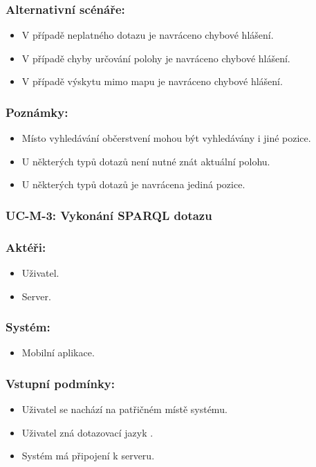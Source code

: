 \subsubsection*{Alternativní scénáře:}
\begin{itemize}
 \item V případě neplatného dotazu je navráceno chybové hlášení.
 \item V případě chyby určování polohy je navráceno chybové hlášení.
 \item V případě výskytu mimo mapu je navráceno chybové hlášení.
\end{itemize}
\subsubsection*{Poznámky:}
\begin{itemize}
 \item Místo vyhledávání občerstvení mohou být vyhledávány i jiné pozice.
 \item U některých typů dotazů není nutné znát aktuální polohu.
 \item U některých typů dotazů je navrácena jediná pozice.
\end{itemize}

\subsubsection{UC-M-3: Vykonání SPARQL dotazu}
\subsubsection*{Aktéři:}
\begin{itemize}
 \item Uživatel.
 \item Server.
\end{itemize}
\subsubsection*{Systém:}
\begin{itemize}
 \item Mobilní aplikace.
\end{itemize}
\subsubsection*{Vstupní podmínky:}
\begin{itemize}
 \item Uživatel se nachází na patřičném místě systému.
 \item Uživatel zná dotazovací jazyk .
 \item Systém má připojení k serveru.
\end{itemize}
